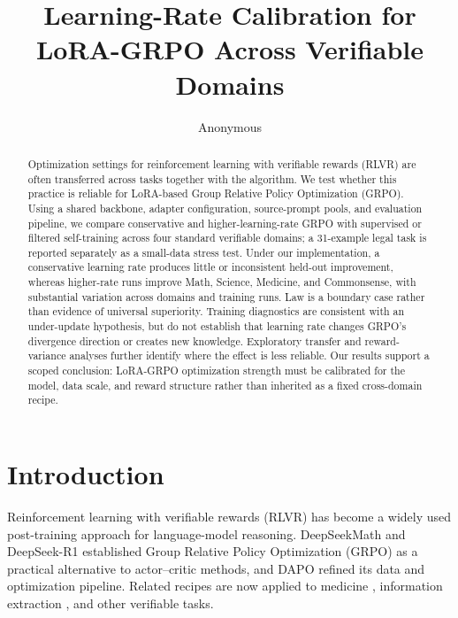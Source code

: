 \documentclass[11pt]{article}
\title{Learning-Rate Calibration for LoRA-GRPO Across Verifiable Domains}
\author{Anonymous}
\begin{document}
\maketitle

\begin{abstract}
Optimization settings for reinforcement learning with verifiable rewards (RLVR) are often transferred across tasks together with the algorithm. We test whether this practice is reliable for LoRA-based Group Relative Policy Optimization (GRPO). Using a shared backbone, adapter configuration, source-prompt pools, and evaluation pipeline, we compare conservative and higher-learning-rate GRPO with supervised or filtered self-training across four standard verifiable domains; a 31-example legal task is reported separately as a small-data stress test. Under our implementation, a conservative learning rate produces little or inconsistent held-out improvement, whereas higher-rate runs improve Math, Science, Medicine, and Commonsense, with substantial variation across domains and training runs. Law is a boundary case rather than evidence of universal superiority. Training diagnostics are consistent with an under-update hypothesis, but do not establish that learning rate changes GRPO's divergence direction or creates new knowledge. Exploratory transfer and reward-variance analyses further identify where the effect is less reliable. Our results support a scoped conclusion: LoRA-GRPO optimization strength must be calibrated for the model, data scale, and reward structure rather than inherited as a fixed cross-domain recipe.
\end{abstract}

\section{Introduction}

Reinforcement learning with verifiable rewards (RLVR) has become a widely used post-training approach for language-model reasoning. DeepSeekMath and DeepSeek-R1 \citep{shao2024deepseekmath,deepseekr1} established Group Relative Policy Optimization (GRPO) as a practical alternative to actor--critic methods, and DAPO \citep{yu2025dapo} refined its data and optimization pipeline. Related recipes are now applied to medicine \citep{med_rlvr}, information extraction \citep{r1_re}, and other verifiable tasks.
\end{document}

